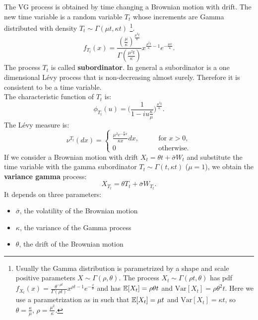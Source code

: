 The VG process is obtained by time changing a Brownian motion with drift. The new time variable is a random variable 
$T_t$ whose increments are Gamma distributed with density $T_t \sim \Gamma(\mu t,\kappa t)$ \footnote{Usually the Gamma distribution is 
parametrized by a shape and scale positive parameters $X \sim \Gamma(\rho,\theta)$. The process $X_t \sim \Gamma(\rho t,\theta)$ 
has pdf 
$f_{X_t}(x) = \frac{\theta^{-\rho t}}{\Gamma(\rho t)}x^{\rho t -1}e^{-\frac{x}{\theta}}$ and has $\mathbb{E}[X_t]=\rho \theta t$ 
and $\mbox{Var}[X_t] = \rho \theta^2 t$. Here we use a parametrization as in \cite{MCC98} such that $\mathbb{E}[X_t]=\mu t$ and $\mbox{Var}
[X_t] = \kappa t$, so $\theta=\frac{\kappa}{\mu}$, $\rho=\frac{\mu^2}{\kappa}$.}.
\begin{equation}
 f_{T_t}(x)= \frac{(\frac{\mu}{\kappa})^{\frac{\mu^2 t}{\kappa}}}{\Gamma(\frac{\mu^2 t}{\kappa})}x^{\frac{\mu^2 t}{\kappa} -1}
 e^{-\frac{\mu x}{\kappa}}.
\end{equation}
The process $T_t$ is called \textbf{subordinator}. In general a subordinator is a one dimensional Lévy process that is 
non-decreasing almost surely. Therefore it is consistent to be a time variable.\\
The characteristic function of $T_t$ is:
\begin{equation}
 \phi_{T_t}(u) = \biggl( \frac{1}{1-iu\frac{\kappa}{\mu}} \biggr)^{\frac{\mu^2 t}{\kappa}} . 
\end{equation}
The Lévy measure is:
\begin{equation}
 \nu^{T_t}(dx) = \begin{cases}
            \frac{\mu^2 e^{-\frac{\mu}{\kappa}x}}{\kappa x} dx, & \hspace{2em} \mbox{for } x>0,\\
            0 & \hspace{2em} \mbox{otherwise.}
           \end{cases}
\end{equation}
\newline
If we consider a Brownian motion with drift $X_t = \theta t + \bar\sigma W_t$ and substitute the time variable with the gamma subordinator
$T_t \sim \Gamma(t,\kappa t)$ ($\mu=1$),
we obtain the \textbf{variance gamma} process:
\begin{equation}\label{VG_process}
 X_{T_t} = \theta T_t + \bar\sigma W_{T_t} .
\end{equation}
It depends on three parameters:
\begin{itemize}
 \item $\bar\sigma$, the volatility of the Brownian motion
 \item $\kappa$, the variance of the Gamma process
 \item $\theta$, the drift of the Brownian motion
\end{itemize}
